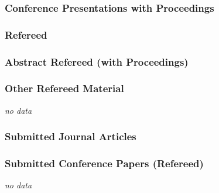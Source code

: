     \subsubsection{Conference Presentations with Proceedings}\label{subsubsec:conference-archived}
    \subsubsection*{Refereed}
        \begin{bibunit}[unsrtcv]
            \nocite{refpaper_2018}
            \putbib[biblio]
        \end{bibunit}

    \subsubsection*{Abstract Refereed (with Proceedings)}
        \begin{bibunit}[unsrtcv]
            \nocite{paper_2018}
            \putbib[biblio]
        \end{bibunit}

    \subsubsection{Other Refereed Material}
        \begin{numerate}
            \item[] \textit{no data}
        \end{numerate}

    \subsubsection{Submitted Journal Articles}\label{subsubsec:submitted-journal}
        \begin{bibunit}[unsrtcv]
            \nocite{submittedjournal_2018}
            \putbib[biblio]
        \end{bibunit}

    \subsubsection{Submitted Conference Papers (Refereed)}
        \begin{numerate}
            \item[] \textit{no data}
        \end{numerate}

